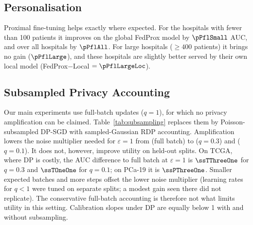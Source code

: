 \subsection{Personalisation}
Proximal fine-tuning helps exactly where expected. For the \pNSmall{} hospitals with fewer than 100 patients it improves on the global FedProx model by $\pPflSmall$ AUC, and over all hospitals by $\pPflAll$. For large hospitals ($\geq 400$ patients) it brings no gain ($\pPflLarge$), and these hospitals are slightly better served by their own local model (FedProx$-$Local $=\pPflLargeLoc$).

\subsection{Subsampled Privacy Accounting}
\label{sec:p19_subsampling}
Our main experiments use full-batch updates ($q=1$), for which no privacy amplification can be claimed. Table~\ref{tab:subsampling} replaces them by Poisson-subsampled DP-SGD with sampled-Gaussian RDP accounting. Amplification lowers the noise multiplier needed for $\varepsilon=1$ from \ssSigFull{} (full batch) to \ssSigThree{} ($q=0.3$) and \ssSigOne{} ($q=0.1$). It does not, however, improve utility on held-out splits. On TCGA, where DP is costly, the AUC difference to full batch at $\varepsilon=1$ is $\ssTThreeOne$ for $q=0.3$ and $\ssTOneOne$ for $q=0.1$; on PCa-19 it is $\ssPThreeOne$. Smaller expected batches and more steps offset the lower noise multiplier (learning rates for $q<1$ were tuned on separate splits; a modest gain seen there did not replicate). The conservative full-batch accounting is therefore not what limits utility in this setting. Calibration slopes under DP are equally below 1 with and without subsampling.



